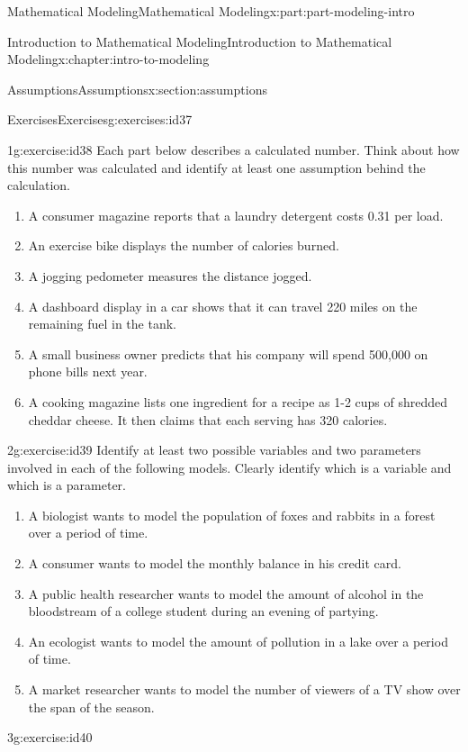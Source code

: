 \documentclass[oneside,10pt,]{book}
\numberwithin{equation}{section}
\begin{document}
\begin{partptx}{Mathematical Modeling}{}{Mathematical Modeling}{}{}{x:part:part-modeling-intro}
\begin{chapterptx}{Introduction to Mathematical Modeling}{}{Introduction to Mathematical Modeling}{}{}{x:chapter:intro-to-modeling}
\begin{sectionptx}{Assumptions}{}{Assumptions}{}{}{x:section:assumptions}
\begin{exercises-subsection-numberless}{Exercises}{}{Exercises}{}{}{g:exercises:id37}
\begin{divisionexercise}{1}{}{}{g:exercise:id38}
Each part below describes a calculated number. Think about how this number was calculated and identify at least one assumption behind the calculation.\begin{enumerate}[font=\bfseries,label=(\alph*),ref=\alph*]
\item{}A consumer magazine reports that a laundry detergent costs \textdollar{}0.31 per load.%
\item{}An exercise bike displays the number of calories burned.%
\item{}A jogging pedometer measures the distance jogged.%
\item{}A dashboard display in a car shows that it can travel 220 miles on the remaining fuel in the tank.%
\item{}A small business owner predicts that his company will spend \textdollar{}500,000 on phone bills next year.%
\item{}A cooking magazine lists one ingredient for a recipe as 1-2 cups of shredded cheddar cheese. It then claims that each serving has 320 calories.%
\end{enumerate}
\end{divisionexercise}%
\begin{divisionexercise}{2}{}{}{g:exercise:id39}%
Identify at least two possible variables and two parameters involved in each of the following models. Clearly identify which is a variable and which is a parameter.\begin{enumerate}[font=\bfseries,label=(\alph*),ref=\alph*]
\item{}A biologist wants to model the population of foxes and rabbits in a forest over a period of time.%
\item{}A consumer wants to model the monthly balance in his credit card.%
\item{}A public health researcher wants to model the amount of alcohol in the bloodstream of a college student during an evening of partying.%
\item{}An ecologist wants to model the amount of pollution in a lake over a period of time.%
\item{}A market researcher wants to model the number of viewers of a TV show over the span of the season.%
\end{enumerate}
\end{divisionexercise}%
\begin{divisionexercise}{3}{}{}{g:exercise:id40}%

\end{divisionexercise}
\end{exercises-subsection-numberless}
\end{sectionptx}
\end{chapterptx}
\end{partptx}
\end{document}
